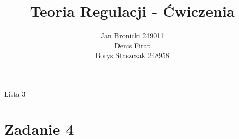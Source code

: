 \documentclass{article}
\title{Teoria Regulacji - Ćwiczenia}
\author{Jan Bronicki 249011\\
        Denis Firat\\
        Borys Staszczak 248958 }
\date{}
\begin{document}
\maketitle


\begin{center}
    Lista 3
\end{center}

\section*{Zadanie 4}
\end{document}

